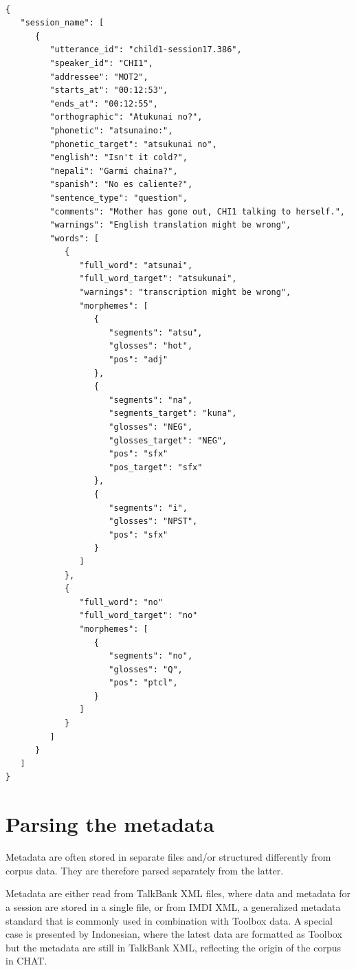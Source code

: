 \documentclass[a4paper, 11pt]{book}
\begin{document}
\begin{verbatim}

{
   "session_name": [
      {
         "utterance_id": "child1-session17.386",
         "speaker_id": "CHI1",
         "addressee": "MOT2",
         "starts_at": "00:12:53",
         "ends_at": "00:12:55",
         "orthographic": "Atukunai no?",
         "phonetic": "atsunaino:",
         "phonetic_target": "atsukunai no",
         "english": "Isn't it cold?",
         "nepali": "Garmi chaina?",
         "spanish": "No es caliente?",
         "sentence_type": "question",
         "comments": "Mother has gone out, CHI1 talking to herself.",
         "warnings": "English translation might be wrong",
         "words": [
            {
               "full_word": "atsunai",
               "full_word_target": "atsukunai",
               "warnings": "transcription might be wrong",
               "morphemes": [
                  {
                     "segments": "atsu",
                     "glosses": "hot",
                     "pos": "adj"
                  },
                  {
                     "segments": "na",
                     "segments_target": "kuna",
                     "glosses": "NEG",
                     "glosses_target": "NEG",
                     "pos": "sfx"
                     "pos_target": "sfx"
                  },
                  {
                     "segments": "i",
                     "glosses": "NPST",
                     "pos": "sfx"
                  }
               ]
            },
            {
               "full_word": "no"
               "full_word_target": "no"
               "morphemes": [
                  {
                     "segments": "no",
                     "glosses": "Q",
                     "pos": "ptcl",
                  }
               ]
            }
         ]
      }
   ]
}

\end{verbatim}


\section{Parsing the metadata}
\label{sec:Parsing the metadata}

Metadata are often stored in separate files and/or structured differently from corpus data. They are therefore parsed separately from the latter. 

Metadata are either read from TalkBank XML files, where data and metadata for a session are stored in a single file, or from IMDI XML, a generalized metadata standard that is commonly used in combination with Toolbox data. A special case is presented by Indonesian, where the latest data are formatted as Toolbox but the metadata are still in TalkBank XML, reflecting the origin of the corpus in CHAT. 
\end{document}
